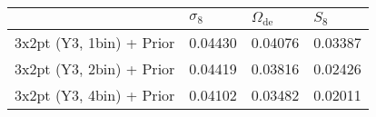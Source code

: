 \begin{tabular}{llll}
\toprule
{} & $\sigma_8$ & $\Omega_\mathrm{de}$ &    $S_8$ \\
\midrule
3x2pt (Y3, 1bin) + Prior &    0.04430 &              0.04076 &  0.03387 \\
3x2pt (Y3, 2bin) + Prior &    0.04419 &              0.03816 &  0.02426 \\
3x2pt (Y3, 4bin) + Prior &    0.04102 &              0.03482 &  0.02011 \\
\bottomrule
\end{tabular}
